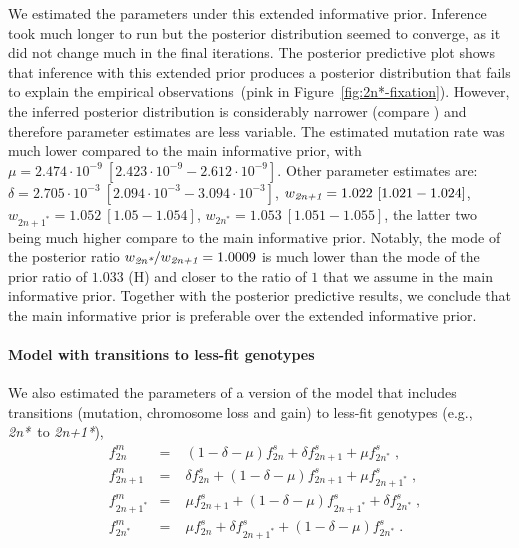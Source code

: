 \documentclass[12pt]{extarticle}
\newcommand{\anwt}{\emph{2n+1}}
\newcommand{\eumt}{\emph{2n*}}
\newcommand{\anmt}{\emph{2n+1*}}
\begin{document}
We estimated the parameters under this extended informative prior.
Inference took much longer to run but the posterior distribution seemed to converge, as it did not change much in the final iterations. 
The posterior predictive plot shows that inference with this extended prior produces a posterior distribution that fails to explain the empirical observations~(pink in Figure~\ref{fig:2n*-fixation}).
However, the inferred posterior distribution is considerably narrower (compare ) and therefore parameter estimates are less variable.
The estimated mutation rate was much lower compared to the main informative prior, 
with $\mu=2.474\cdot10^{-9}\ [2.423\cdot10^{-9}-2.612\cdot10^{-9}]$. Other parameter estimates are: $\delta=2.705\cdot10^{-3}\ [2.094\cdot10^{-3}-3.094\cdot10^{-3}]$,
$w_{\anwt}=1.022\ [1.021-1.024]$,
$w_{2n+1^*}=1.052\ [1.05-1.054]$,
$w_{2n^*}=1.053\ [1.051-1.055]$, the latter two being much higher compare to the main informative prior. 
Notably, the mode of the posterior ratio $w_{\eumt}/w_{\anwt}=1.0009$ is much lower than the mode of the prior ratio of $1.033$ (H) and closer to the ratio of $1$ that we assume in the main informative prior.
Together with the posterior predictive results, we conclude that the main informative prior is preferable over the extended informative prior.


\paragraph{Model with transitions to less-fit genotypes}

We also estimated the parameters of a version of the model that includes transitions (mutation, chromosome loss and gain) to less-fit genotypes (e.g., \eumt\ to \anmt),
\begin{equation} \label{eq:mutation-aneuploidy-single}
    \begin{aligned}
      &f^m_{2n} &=&\; (1 - \delta - \mu) f^s_{2n} + \delta f^s_{2n+1} + \mu f^s_{2n^*} \;,\\
      &f^m_{2n+1} &=&\; \delta f^s_{2n} + (1 - \delta - \mu) f^s_{2n+1} + \mu f^s_{2n+1^*}  \;,\\
      &f^m_{2n+1^*} &=&\; \mu f^s_{2n+1} + (1 - \delta - \mu) f^s_{2n+1^*} + \delta f^s_{2n^*}  \;,\\
      &f^m_{2n^*} &=&\; \mu f^s_{2n} + \delta f^s_{2n+1^*} + (1 - \delta - \mu) f^s_{2n^*}  \;.
    \end{aligned}
    \end{equation}
\end{document}
